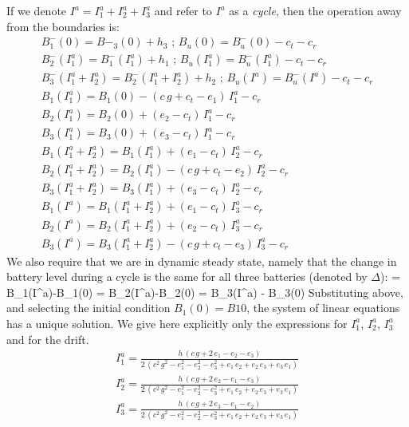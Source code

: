 \documentclass[12 pt]{article}
\newcommand{\debug}[1]{\mbox{\tt #1}}
\renewcommand{\debug}[1]{}              \newcommand{\cmd}[1]{}
\newcommand{\2}{\>\>}
\newcommand{\3}{\>\>\>}
\newcommand{\4}{\>\>\>\>}
\newcommand{\5}{\>\>\>\>\>}
\newcommand{\6}{\>\>\>\>\>\>}
\newcommand{\7}{\6\>}
\newcommand{\8}{\6\2}
\newcommand{\dlabel}[1]{\debug{\fbox{\tiny #1}}\cmd{dlabel}\label{#1}}
\newcounter{protblock}
\newcounter{line}[protblock]
\begin{document}
If we denote $I^a = I_1^a + I_2^a + I_3^a$ and refer to $I^a$ as a \emph{cycle}, then the operation away from the boundaries is:
\begin{eqnarray}
\nonumber B^{-}_1(0)=B{-}_3(0 )+h_3\text{     ;     }B_u(0) = B^{-}_u(0) - c_t -c_r\\
\nonumber B^{-}_2 (I_1^a) = B^{-}_1(I_1^a) + h_1\text{     ;     }B_u(I_1^a) = B^{-}_u(I_1^a) - c_t -c_r\\
\nonumber B^{-}_3 (I_1^a+I_2^a) = B^{-}_2(I_1^a+I_2^a) + h_2\text{     ;     }B_u(I^a) = B^{-}_u(I^a) - c_t -c_r\\
\nonumber B_1(I_1^a) = B_1(0) - (c\,g+c_t -e_1)\,I_1^a - c_r \\
\nonumber B_2(I_1^a) = B_2(0) + (e_2-c_t)\, I_1^a - c_r \\
\nonumber B_3(I_1^a) = B_3(0) + (e_3-c_t)\, I_1^a -c_r\\
\nonumber B_1(I_1^a+I_2^a) = B_1(I_1^a) + (e_1-c_t)\,I_2^a - c_r \\
\nonumber B_2(I_1^a+I_2^a) = B_2(I_1^a) - (c\,g + c_t - e_2)\,I_2^a -c_r \\
\nonumber B_3(I_1^a+I_2^a) = B_3(I_1^a) + (e_3 - c_t)\,I_2^a -c_r\\
\nonumber B_1(I^a) = B_1(I_1^a+I_2^a) + (e_1-c_t)\,I_3^a - c_r\\
\nonumber B_2(I^a) = B_2(I_1^a+I_2^a) + (e_2 - c_t)\,I_3^a - c_r\\
B_3(I^a) = B_3(I_1^a+I_2^a) - (c\,g + c_t - e_3)\,I_3^a - c_r
\end{eqnarray}
We also require that we are in dynamic steady state, namely that the change in battery level during a cycle is the same for all three batteries (denoted by $\Delta$):
\SB
\Delta = B_1(I^a)-B_1(0) = B_2(I^a)-B_2(0) = B_3(I^a) - B_3(0)
\SE
Substituting above, and selecting the initial condition $B_1(0) = B10$, the system of linear equations has a unique solution.  We give here explicitly only the expressions for $I_1^a$, $I_2^a$, $I_3^a$ and for the drift.
\begin{eqnarray}
\nonumber I_1^a = \frac{h\,(c\,g + 2\,e_1 -e_2 -e_3)}{2\,(c^2\,g^2 -e_1^2 - e_2^2 -e_3^2 +e_1\,e_2+e_2\,e_3 +e_3\,e_1)} \\
\nonumber I_2^a = \frac{h\,(c\,g + 2\,e_2 -e_1 -e_3)}{2\,(c^2\,g^2 -e_1^2 - e_2^2 -e_3^2 +e_1\,e_2+e_2\,e_3 +e_3\,e_1)} \\
I_3^a = \frac{h\,(c\,g + 2\,e_3 -e_1 -e_2)}{2\,(c^2\,g^2 -e_1^2 - e_2^2 -e_3^2 +e_1\,e_2+e_2\,e_3 +e_3\,e_1)} \dlabel{eq-away3}
\end{eqnarray}
\end{document}
